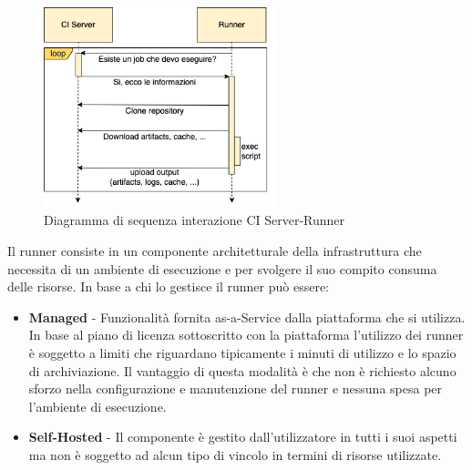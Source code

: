 \begin{figure}[H]
    \centering
    \includegraphics[width=0.6\textwidth]{img/ciserver-runner.png}
    \caption{Diagramma di sequenza interazione CI Server-Runner}
    \label{ci-server-runner}
\end{figure}

Il runner consiste in un componente architetturale della infrastruttura che necessita di un ambiente di esecuzione e per svolgere il suo compito consuma delle risorse. In base a chi lo gestisce il runner può essere:

\begin{itemize}
    \item \textbf{Managed} - Funzionalità fornita as-a-Service dalla piattaforma che si utilizza. In base al piano di licenza sottoscritto con la piattaforma l'utilizzo dei runner è soggetto a limiti che riguardano tipicamente i minuti di utilizzo e lo spazio di archiviazione. Il vantaggio di questa modalità è che non è richiesto alcuno sforzo nella configurazione e manutenzione del runner e nessuna spesa per l'ambiente di esecuzione.
    \item \textbf{Self-Hosted} - Il componente è gestito dall'utilizzatore in tutti i suoi aspetti ma non è soggetto ad alcun tipo di vincolo in termini di risorse utilizzate.
\end{itemize}